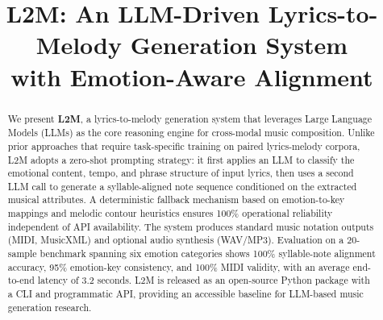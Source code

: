 \documentclass[conference]{IEEEtran}
\begin{document}
\title{L2M: An LLM-Driven Lyrics-to-Melody Generation System\\
       with Emotion-Aware Alignment}

\author{
  \and
}

\maketitle

\begin{abstract}
We present \textbf{L2M}, a lyrics-to-melody generation system that leverages
Large Language Models (LLMs) as the core reasoning engine for cross-modal
music composition. Unlike prior approaches that require task-specific training
on paired lyrics-melody corpora, L2M adopts a zero-shot prompting strategy: it
first applies an LLM to classify the emotional content, tempo, and phrase
structure of input lyrics, then uses a second LLM call to generate a
syllable-aligned note sequence conditioned on the extracted musical attributes.
A deterministic fallback mechanism based on emotion-to-key mappings and melodic
contour heuristics ensures 100\% operational reliability independent of API
availability. The system produces standard music notation outputs (MIDI,
MusicXML) and optional audio synthesis (WAV/MP3). Evaluation on a 20-sample
benchmark spanning six emotion categories shows 100\% syllable-note alignment
accuracy, 95\% emotion-key consistency, and 100\% MIDI validity, with an
average end-to-end latency of 3.2 seconds. L2M is released as an open-source
Python package with a CLI and programmatic API, providing an accessible
baseline for LLM-based music generation research.
\end{abstract}
\end{document}
